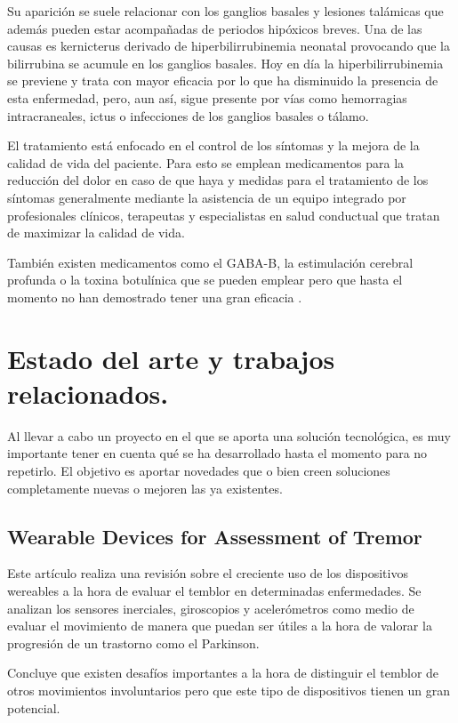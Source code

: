 Su aparición se suele relacionar con los ganglios basales y lesiones talámicas que además pueden estar acompañadas de periodos hipóxicos breves. Una de las causas es kernicterus derivado de hiperbilirrubinemia neonatal provocando que la bilirrubina se acumule en los ganglios basales. Hoy en día la hiperbilirrubinemia se previene y trata con mayor eficacia por lo que ha disminuido la presencia de esta enfermedad, pero, aun así, sigue presente por vías como hemorragias intracraneales, ictus o infecciones de los ganglios basales o tálamo.

El tratamiento está enfocado en el control de los síntomas y la mejora de la calidad de vida del paciente. Para esto se emplean medicamentos para la reducción del dolor en caso de que haya y medidas para el tratamiento de los síntomas generalmente mediante la asistencia de un equipo integrado por profesionales clínicos, terapeutas y especialistas en salud conductual que tratan de maximizar la calidad de vida.

También existen medicamentos como el GABA-B, la estimulación cerebral profunda o la toxina botulínica que se pueden emplear pero que hasta el momento no han demostrado tener una gran eficacia \cite{Li2022}.

\section{Estado del arte y trabajos relacionados.}

Al llevar a cabo un proyecto en el que se aporta una solución tecnológica, es muy importante tener en cuenta qué se ha desarrollado hasta el momento para no repetirlo. El objetivo es aportar novedades que o bien creen soluciones completamente nuevas o mejoren las ya existentes.

\subsection{Wearable Devices for Assessment of Tremor}

Este artículo realiza una revisión sobre el creciente uso de los dispositivos wereables a la hora de evaluar el temblor en determinadas enfermedades. Se analizan los sensores inerciales, giroscopios y acelerómetros como medio de evaluar el movimiento de manera que puedan ser útiles a la hora de valorar la progresión de un trastorno como el Parkinson. 

Concluye que existen desafíos importantes a la hora de distinguir el temblor de otros movimientos involuntarios pero que este tipo de dispositivos tienen un gran potencial. \cite{Vescio2021}

